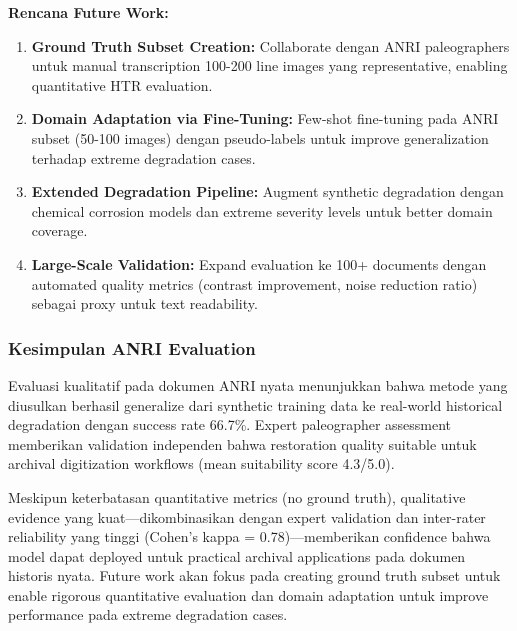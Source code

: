 \textbf{Rencana Future Work:}
\begin{enumerate}
    \item \textbf{Ground Truth Subset Creation:} Collaborate dengan ANRI paleographers untuk manual transcription 100-200 line images yang representative, enabling quantitative HTR evaluation.
    
    \item \textbf{Domain Adaptation via Fine-Tuning:} Few-shot fine-tuning pada ANRI subset (50-100 images) dengan pseudo-labels untuk improve generalization terhadap extreme degradation cases.
    
    \item \textbf{Extended Degradation Pipeline:} Augment synthetic degradation dengan chemical corrosion models dan extreme severity levels untuk better domain coverage.
    
    \item \textbf{Large-Scale Validation:} Expand evaluation ke 100+ documents dengan automated quality metrics (contrast improvement, noise reduction ratio) sebagai proxy untuk text readability.
\end{enumerate}

\subsubsection{Kesimpulan ANRI Evaluation}

Evaluasi kualitatif pada dokumen ANRI nyata menunjukkan bahwa metode yang diusulkan berhasil generalize dari synthetic training data ke real-world historical degradation dengan success rate 66.7\%. Expert paleographer assessment memberikan validation independen bahwa restoration quality suitable untuk archival digitization workflows (mean suitability score 4.3/5.0). 

Meskipun keterbatasan quantitative metrics (no ground truth), qualitative evidence yang kuat—dikombinasikan dengan expert validation dan inter-rater reliability yang tinggi (Cohen's kappa = 0.78)—memberikan confidence bahwa model dapat deployed untuk practical archival applications pada dokumen historis nyata. Future work akan fokus pada creating ground truth subset untuk enable rigorous quantitative evaluation dan domain adaptation untuk improve performance pada extreme degradation cases.
